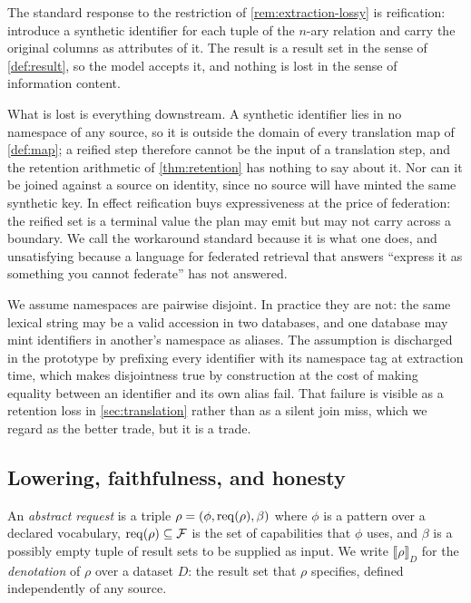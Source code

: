 \begin{remark}
\label{rem:nary-workaround}
The standard response to the restriction of \cref{rem:extraction-lossy} is
reification: introduce a synthetic identifier for each tuple of the $n$-ary
relation and carry the original columns as attributes of it. The result is a
result set in the sense of \cref{def:result}, so the model accepts it, and
nothing is lost in the sense of information content.

What is lost is everything downstream. A synthetic identifier lies in no
namespace of any source, so it is outside the domain of every translation map
of \cref{def:map}; a reified step therefore cannot be the input of a
translation step, and the retention arithmetic of \cref{thm:retention} has
nothing to say about it. Nor can it be joined against a source on identity,
since no source will have minted the same synthetic key. In effect reification
buys expressiveness at the price of federation: the reified set is a terminal
value the plan may emit but may not carry across a boundary. We call the
workaround standard because it is what one does, and unsatisfying because a
language for federated retrieval that answers ``express it as something you
cannot federate'' has not answered.
\end{remark}

\begin{remark}
\label{rem:disjoint}
We assume namespaces are pairwise disjoint. In practice they are not: the same
lexical string may be a valid accession in two databases, and one database may
mint identifiers in another's namespace as aliases. The assumption is
discharged in the prototype by prefixing every identifier with its namespace
tag at extraction time, which makes disjointness true by construction at the
cost of making equality between an identifier and its own alias fail. That
failure is visible as a retention loss in \cref{sec:translation} rather than as
a silent join miss, which we regard as the better trade, but it is a trade.
\end{remark}

\subsection{Lowering, faithfulness, and honesty}

\begin{definition}
\label{def:areq}
An \emph{abstract request} is a triple $\rho = (\phi, \mathrm{req}(\rho), \beta)$ where
$\phi$ is a pattern over a declared vocabulary, $\mathrm{req}(\rho) \subseteq \mathcal{F}$ is
the set of capabilities that $\phi$ uses, and $\beta$ is a possibly empty tuple
of result sets to be supplied as input. We write $\llbracket \rho \rrbracket_D$
for the \emph{denotation} of $\rho$ over a dataset $D$: the result set that
$\rho$ specifies, defined independently of any source.
\end{definition}

